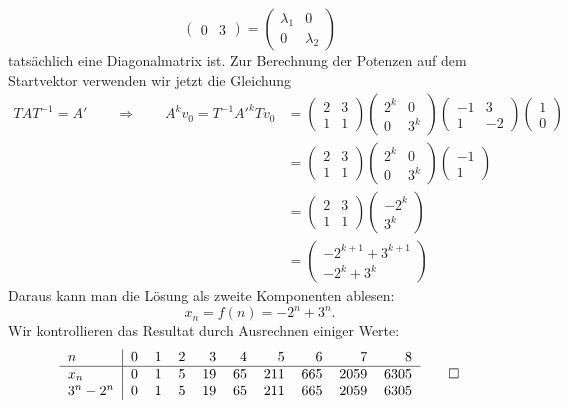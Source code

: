 \begin{loesung}
\[\begin{pmatrix}
0&3
\end{pmatrix}
=
\begin{pmatrix}
\lambda_1&0\\
0&\lambda_2
\end{pmatrix}
\]
tatsächlich eine Diagonalmatrix ist.
Zur Berechnung der Potenzen auf dem Startvektor verwenden wir jetzt die 
Gleichung
\begin{align*}
TAT^{-1}
=
A'
\qquad\Rightarrow\qquad
A^kv_0
=
T^{-1}A'^kTv_0
&=
\begin{pmatrix}
2&3\\
1&1
\end{pmatrix}
\begin{pmatrix}
2^k& 0\\
 0 &3^k
\end{pmatrix}
\begin{pmatrix}
-1& 3\\
 1&-2
\end{pmatrix}
\begin{pmatrix}
1\\0
\end{pmatrix}
\\
&=
\begin{pmatrix}
2&3\\
1&1
\end{pmatrix}
\begin{pmatrix}
2^k& 0\\
 0 &3^k
\end{pmatrix}
\begin{pmatrix}
-1\\1
\end{pmatrix}
\\
&=
\begin{pmatrix}
2&3\\
1&1
\end{pmatrix}
\begin{pmatrix}
-2^k\\
 3^k
\end{pmatrix}
\\
&=
\begin{pmatrix}
-2^{k+1}+3^{k+1}\\
-2^k+3^k
\end{pmatrix}
\end{align*}
Daraus kann man die Lösung als zweite Komponenten ablesen:
\[
x_n=f(n)=-2^n+3^n.
\]
Wir kontrollieren das Resultat durch Ausrechnen einiger Werte:
\[
\begin{tabular}{l|rrrrrrrrr}
$n$&0&1&2&3&4&5&6&7&8\\
\hline
$x_n$&0&1&5&19&65&211&665&2059&6305\\
$3^n-2^n$&0&1&5&19&65&211&665&2059&6305\\
\end{tabular}
\qedhere
\]
\end{loesung}

